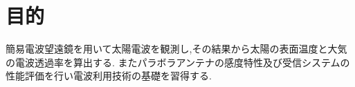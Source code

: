 \section{目的}
簡易電波望遠鏡を用いて太陽電波を観測し,その結果から太陽の表面温度と大気の電波透過率を算出する.
またパラボラアンテナの感度特性及び受信システムの性能評価を行い電波利用技術の基礎を習得する.